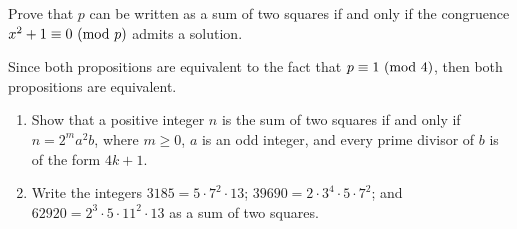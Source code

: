 \begin{exercise}
    Prove that $p$ can be written as a sum of two squares if and only if the congruence $x^2 + 1 \equiv 0 \ (\mathrm{mod}\ p)$ admits a solution. \\
\end{exercise}

\begin{solution}
    Since both propositions are equivalent to the fact that $p \equiv 1 \ (\mathrm{mod}\ 4)$, then both propositions are equivalent. \\
\end{solution}

\begin{exercise}
    \begin{enumerate}
        \item Show that a positive integer $n$ is the sum of two squares if and only if $n = 2^m a^2b$, where $m \geq 0$, $a$ is an odd integer, and every prime divisor of $b$ is of the form $4k + 1$.
        \item Write the integers $3185 = 5\cdot 7^2 \cdot 13$; $39690 = 2\cdot 3^4 \cdot 5 \cdot 7^2$; and $62920 = 2^3\cdot 5\cdot 11^2 \cdot 13$ as a sum of two squares. \\
    \end{enumerate}
\end{exercise}

